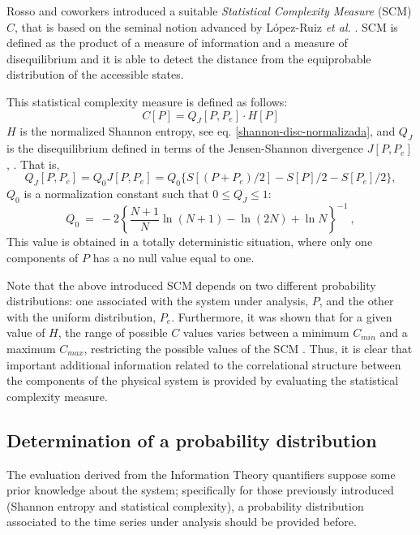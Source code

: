 Rosso and coworkers \cite{Lamberti2004} introduced a suitable \textit{Statistical Complexity Measure} (SCM) $C$, that is  based on the seminal notion advanced by L\'opez-Ruiz {\it et al.} \cite{Lopez-Ruiz1995}. SCM is defined as the product of a measure of information and a measure of disequilibrium  and it is able to detect the distance from the equiprobable distribution of the accessible states.

This statistical complexity measure\cite{Martin2003,Lamberti2004} is defined as follows: 
\begin{equation}
C[P] = Q_{J}[P,P_e] \cdot H[P]
\label{complexity}
\end{equation}
$H$ is the normalized Shannon entropy, see eq. \ref{shannon-disc-normalizada}, and $Q_{J}$ is the disequilibrium  defined in terms of the Jensen-Shannon divergence $J[P, P_e]$, \cite{Grosse2002}.
That is,
\begin{equation}
\label{disequilibrium}	
Q_{J} [ P, P_e] = Q_{0} J[ P, P_e] = Q_{0} \{ S[(P + P_e)/2 ] - S[ P ]/2 - S[P_e]/2\},
\end{equation}
$Q_0$ is a normalization constant such that $0 \leq Q_{J} \leq 1$:
\begin{equation}
Q_0 ~=~ -2 \left\{ {\frac{N+1}{N}} \ln (N+1) - \ln (2N) + \ln N \right\}^{-1} \ ,
\label{q0-jensen-1}
\end{equation}
This value is obtained in a totally deterministic situation, where only one components of $P$ has a no null value equal to one.

Note that the above introduced SCM depends on two different probability distributions: one associated with the system under analysis, $P$, and the other with the uniform distribution, $P_e$.
Furthermore, it was shown that for a given value of $H$, the range of possible $C$ values varies between a minimum $C_{min}$ and a maximum $C_{max}$, restricting the possible values of the SCM \cite{Martin2006}.
Thus, it is clear that important additional information related to the correlational structure between the components of the physical system is provided by evaluating the statistical complexity measure. 

\subsection{Determination of a probability distribution}

The evaluation derived from the  Information Theory quantifiers suppose some prior knowledge about the system; specifically for those previously introduced (Shannon entropy and statistical complexity), a probability distribution associated to the time series under analysis should be provided before.

